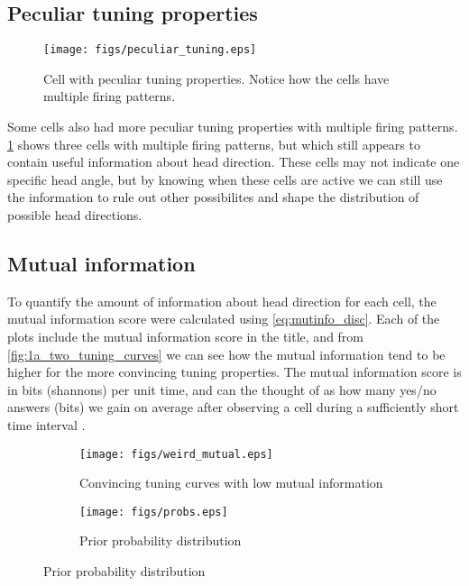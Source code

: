 \subsection{Peculiar tuning properties}
\begin{figure}[H]
    \centering
    \texttt{[image: figs/peculiar\_tuning.eps]}
    \caption{Cell with peculiar tuning properties. Notice how the cells have multiple firing patterns.}
    \label{fig:peculiar_tuning}
\end{figure}
Some cells also had more peculiar tuning properties with multiple firing patterns. \cref{fig:peculiar_tuning} shows three cells with multiple firing patterns, but which still appears to contain useful information about head direction. These cells may not indicate one specific head angle, but by knowing when these cells are active we can still use the information to rule out other possibilites and shape the distribution of possible head directions.

\subsection{Mutual information}
To quantify the amount of information about head direction for each cell, the mutual information score were calculated using \cref{eq:mutinfo_disc}. Each of the plots include the mutual information score in the title, and from \cref{fig:1a_two_tuning_curves} we can see how the mutual information tend to be higher for the more convincing tuning properties. The mutual information score is in bits (shannons) per unit time, and can the thought of as how many yes/no answers (bits) we gain on average after observing a cell during a sufficiently short time interval \cite{mutualinfo}.

\begin{figure}[H]
    \centering
    \begin{subfigure}[b]{0.49\textwidth}
        \texttt{[image: figs/weird\_mutual.eps]}
        \caption{Convincing tuning curves with low mutual information}
        \label{fig:weird_mutual}
    \end{subfigure}
    \begin{subfigure}[b]{0.49\textwidth}
        \texttt{[image: figs/probs.eps]}
        \caption{Prior probability distribution}
        \label{fig:probs}
    \end{subfigure}
\end{figure}

